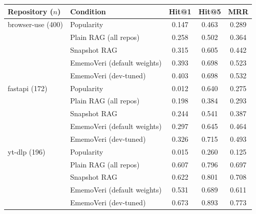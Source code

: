 \begin{tabular}{llccc}
\toprule
Repository ($n$) & Condition & Hit@1 & Hit@5 & MRR \\
\midrule
browser-use (400) & Popularity & 0.147 & 0.463 & 0.289 \\
 & Plain RAG (all repos) & 0.258 & 0.502 & 0.364 \\
 & Snapshot RAG & 0.315 & 0.605 & 0.442 \\
 & EmemoVeri (default weights) & 0.393 & 0.698 & 0.523 \\
 & EmemoVeri (dev-tuned) & 0.403 & 0.698 & 0.532 \\
\midrule
fastapi (172) & Popularity & 0.012 & 0.640 & 0.275 \\
 & Plain RAG (all repos) & 0.198 & 0.384 & 0.293 \\
 & Snapshot RAG & 0.244 & 0.541 & 0.387 \\
 & EmemoVeri (default weights) & 0.297 & 0.645 & 0.464 \\
 & EmemoVeri (dev-tuned) & 0.326 & 0.715 & 0.493 \\
\midrule
yt-dlp (196) & Popularity & 0.015 & 0.260 & 0.125 \\
 & Plain RAG (all repos) & 0.607 & 0.796 & 0.697 \\
 & Snapshot RAG & 0.622 & 0.801 & 0.708 \\
 & EmemoVeri (default weights) & 0.531 & 0.689 & 0.611 \\
 & EmemoVeri (dev-tuned) & 0.673 & 0.893 & 0.773 \\
\bottomrule
\end{tabular}